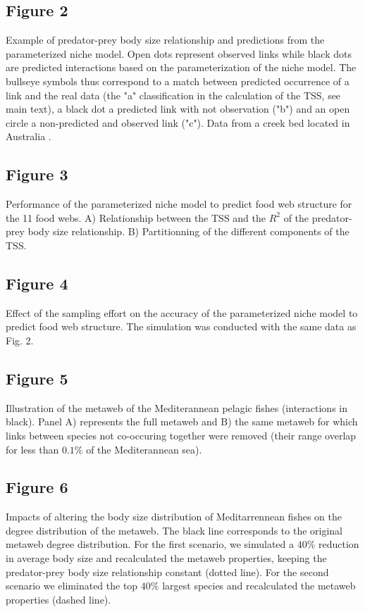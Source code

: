 \documentclass[12pt]{article}
\begin{document}
\subsection*{Figure 2}
Example of predator-prey body size relationship and predictions from the parameterized niche model. Open dots represent observed links while black dots are predicted interactions based on the parameterization of the niche model. The bullseye symbols thus correspond to a match between predicted occurrence of a link and the real data (the "a" classification in the calculation of the TSS, see main text), a black dot a predicted link with not observation ("b") and an open circle a non-predicted and observed link ("c"). Data from a creek bed located in Australia \parencite{Brose2005}. 

\subsection*{Figure 3}
Performance of the parameterized niche model to predict food web structure for the 11 food webs. A) Relationship between the TSS and the $R^2$ of the predator-prey body size relationship. B) Partitionning of the different components of the TSS.  	

\subsection*{Figure 4}
Effect of the sampling effort on the accuracy of the parameterized niche model to predict food web structure. The simulation was conducted with the same data as Fig. 2.

\subsection*{Figure 5}
Illustration of the metaweb of the Mediterannean pelagic fishes (interactions in black). Panel A) represents the full metaweb and B) the same metaweb for which links between species not co-occuring together were removed (their range overlap for less than $0.1\%$ of the Mediterannean sea). 

\subsection*{Figure 6}
Impacts of altering the body size distribution of Meditarrennean fishes on the degree distribution of the metaweb. The black line corresponds to the original metaweb degree distribution. For the first scenario, we simulated a $40\%$ reduction in average body size and recalculated the metaweb properties, keeping the predator-prey body size relationship constant (dotted line). For the second scenario we eliminated the top $40\%$ largest species and recalculated the metaweb properties (dashed line).   
\end{document}
